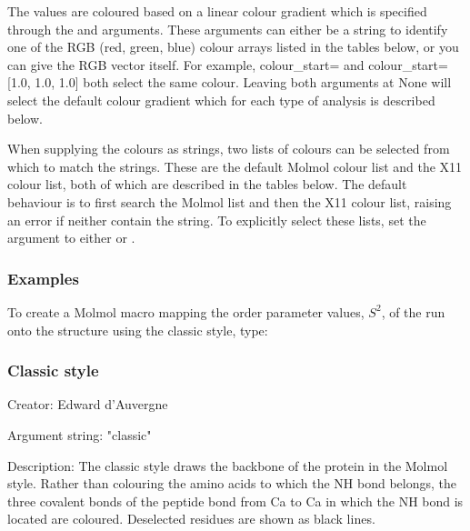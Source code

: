  The values are coloured based on a linear colour gradient which is specified through the  and  arguments.  These arguments can either be a string to identify one of the RGB (red, green, blue) colour arrays listed in the tables below, or you can give the RGB vector itself.  For example, colour\_start= and colour\_start=[1.0, 1.0, 1.0] both select the same colour.  Leaving both arguments at None will select the default colour gradient which for each type of analysis is described below. 
  

 When supplying the colours as strings, two lists of colours can be selected from which to match the strings.  These are the default Molmol colour list and the X11 colour list, both of which are described in the tables below.  The default behaviour is to first search the Molmol list and then the X11 colour list, raising an error if neither contain the string. To explicitly select these lists, set the  argument to either  or . 
  

  
 \subsubsection{Examples} 

 To create a Molmol macro mapping the order parameter values, $S^2$, of the run  onto the structure using the classic style, type: 
  




  
 \subsubsection{Classic style} 

 Creator:  Edward d'Auvergne 
  

 Argument string:  "classic" 
  

 Description:  The classic style draws the backbone of the protein in the Molmol  style.  Rather than colouring the amino acids to which the NH bond belongs, the three covalent bonds of the peptide bond from Ca to Ca in which the NH bond is located are coloured.  Deselected residues are shown as black lines. 
  

